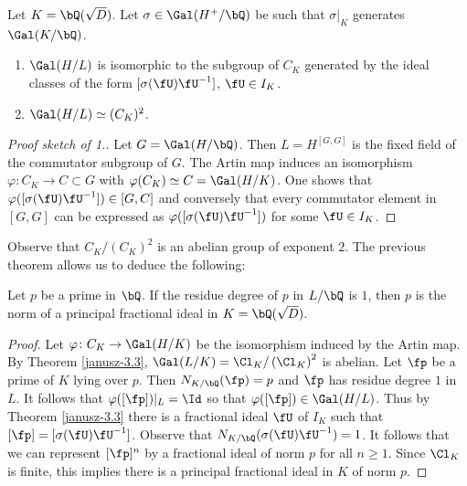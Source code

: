 \begin{thm}\cite[Ch. VI, $\S$3, Theorem 3.3]{Janusz}\label{janusz-3.3}
    Let $K = \bQ(\sqrt{D})$. Let $\sigma \in \Gal(H^{+} / \bQ)$ be such that $\sigma|_{K}$ generates $\Gal(K / \bQ)$.
    \begin{enumerate}
        \item $\Gal(H / L)$ is isomorphic to the subgroup of $C_K$ generated by the ideal classes of the form $[\sigma(\fU)\fU^{-1}]$, $\fU \in I_K$. 
        \item $\Gal(H / L) \simeq (C_K)^2$. 
    \end{enumerate}
\end{thm}

\begin{proof}[Proof sketch of 1.]
    Let $G = \Gal(H / \bQ)$. Then $L = H^{[G, G]}$ is the fixed field of the commutator subgroup of $G$. The Artin map induces an isomorphism $\varphi \colon C_K \to C \subset G$ with $\varphi(C_K) \simeq C = \Gal(H / K)$. One shows that $\varphi([\sigma(\fU)\fU^{-1}]) \in [G, C]$ and conversely that every commutator element in $[G, G]$ can be expressed as $\varphi([\sigma(\fU)\fU^{-1}])$ for some $\fU \in I_K$. 
\end{proof}

Observe that $C_K / (C_K)^2$ is an abelian group of exponent $2$.
The previous theorem allows us to deduce the following:

\begin{thm}\label{p-principal}
Let $p$ be a prime in $\bQ$. If the residue degree of $p$ in $L / \bQ$ is $1$, then $p$ is the norm of a principal fractional ideal in $K = \bQ(\sqrt{D})$. 
\end{thm} 

\begin{proof}
Let $\varphi \colon C_K \to \Gal(H / K)$ be the isomorphism induced by the Artin map. By Theorem \ref{janusz-3.3}, $\Gal(L / K) = \Cl_K / \left(\Cl_K\right)^2$ is abelian. Let $\fp$ be a prime of $K$ lying over $p$. Then $N_{K / \bQ}(\fp) = p$ and $\fp$ has residue degree $1$ in $L$. It follows that $\varphi([\fp])|_{L} = \Id$ so that $\varphi([\fp]) \in \Gal(H / L)$. Thus by Theorem \ref{janusz-3.3} there is a fractional ideal $\fU$ of $I_K$ such that 
$[\fp] = [\sigma(\fU)\fU^{-1}]$. Observe that $N_{K / \bQ}(\sigma(\fU)\fU^{-1}) = 1$. It follows that we can represent $[\fp]^n$ by a fractional ideal of norm $p$ for all $n \geq 1$. Since $\Cl_K$ is finite, this implies there is a principal fractional ideal in $K$ of norm $p$. 
\end{proof}

